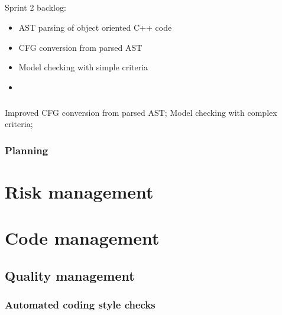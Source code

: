 \documentclass{report}
\begin{document}
\paragraph{}
\hspace{4mm}\textnormal{Sprint 2 backlog:}

\vspace{4mm}
\begin{itemize}
\item AST parsing of object oriented C++ code\vspace{1mm}
\item CFG conversion from parsed AST\vspace{1mm}
\item Model checking with simple criteria\vspace{1mm}
\item \vspace{1mm}
\end{itemize}

\paragraph{}
\hspace{4mm}\textnormal{Improved CFG conversion from parsed AST;
Model checking with complex criteria;}

\subsection{Planning}


\chapter{Risk management}


\chapter{Code management}

\section{Quality management}

\subsection{Automated coding style checks}
\end{document}
